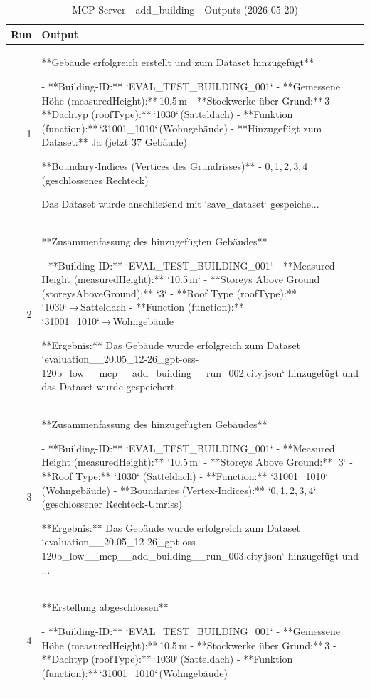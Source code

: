 \documentclass[a4paper,11pt]{article}
\begin{document}
\begin{table}[ht]
\centering
\scriptsize
\caption{MCP Server - add\_building - Outputs (2026-05-20)}
\label{tab:mcp\_add\_building\_outputs\_2026-05-20}
\begin{tabular}{r p{12cm}}
\hline
Run & Output \\
\hline
1 & **Gebäude erfolgreich erstellt und zum Dataset hinzugefügt**

- **Building‑ID:** `EVAL\_TEST\_BUILDING\_001`  
- **Gemessene Höhe (measuredHeight):** 10.5 m  
- **Stockwerke über Grund:** 3  
- **Dachtyp (roofType):** `1030` (Satteldach)  
- **Funktion (function):** `31001\_1010` (Wohngebäude)  
- **Hinzugefügt zum Dataset:** Ja (jetzt 37 Gebäude)  

**Boundary‑Indices (Vertices des Grundrisses)**
- 0, 1, 2, 3, 4 (geschlossenes Rechteck)  

Das Dataset wurde anschließend mit `save\_dataset` gespeiche... \\
2 & **Zusammenfassung des hinzugefügten Gebäudes**

- **Building-ID:** `EVAL\_TEST\_BUILDING\_001`  
- **Measured Height (measuredHeight):** `10.5 m`  
- **Storeys Above Ground (storeysAboveGround):** `3`  
- **Roof Type (roofType):** `1030` → Satteldach  
- **Function (function):** `31001\_1010` → Wohngebäude  

**Ergebnis:** Das Gebäude wurde erfolgreich zum Dataset `evaluation\_\_20.05\_12-26\_gpt-oss-120b\_low\_\_mcp\_\_add\_building\_\_run\_002.city.json` hinzugefügt und das Dataset wurde gespeichert. \\
3 & **Zusammenfassung des hinzugefügten Gebäudes**

- **Building-ID:** `EVAL\_TEST\_BUILDING\_001`  
- **Measured Height (measuredHeight):** `10.5 m`  
- **Storeys Above Ground:** `3`  
- **Roof Type:** `1030` (Satteldach)  
- **Function:** `31001\_1010` (Wohngebäude)  
- **Boundaries (Vertex‑Indices):** `0, 1, 2, 3, 4` (geschlossener Rechteck‑Umriss)

**Ergebnis:** Das Gebäude wurde erfolgreich zum Dataset `evaluation\_\_20.05\_12-26\_gpt-oss-120b\_low\_\_mcp\_\_add\_building\_\_run\_003.city.json` hinzugefügt und ... \\
4 & **Erstellung abgeschlossen**

- **Building‑ID:** `EVAL\_TEST\_BUILDING\_001`  
- **Gemessene Höhe (measuredHeight):** 10.5 m  
- **Stockwerke über Grund:** 3  
- **Dachtyp (roofType):** `1030` (Satteldach)  
- **Funktion (function):** `31001\_1010` (Wohngebäude)  


\end{tabular}
\end{table}
\end{document}
